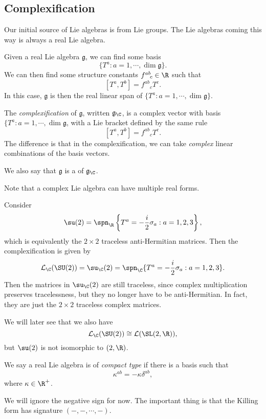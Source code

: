 \documentclass[a4paper]{article}
\begin{document}
\subsection{Complexification}
Our initial source of Lie algebras is from Lie groups. The Lie algebras coming this way is always a real Lie algebra.

\begin{defi}
  Given a real Lie algebra $\mathfrak{g}$, we can find some basis
  \[
    \{T^a: a = 1, \cdots, \dim \mathfrak{g}\}.
  \]
  We can then find some structure constants $f^{ab}\!_c \in \R$ such that
  \[
    [T^a, T^b] = f^{ab}\!_c T^c.
  \]
  In this case, $\mathfrak{g}$ is then the real linear span of $\{T^a: a = 1, \cdots, \dim \mathfrak{g}\}$.

  The \emph{complexification} of $\mathfrak{g}$, written $\mathfrak{g}_\C$, is a complex vector with basis $\{T^a: a = 1, \cdots, \dim \mathfrak{g}$, with a Lie bracket defined by the same rule
  \[
    [T^a, T^b] = f^{ab}\!_c T^c.
  \]
  The difference is that in the complexification, we can take \emph{complex} linear combinations of the basis vectors.

  We also say that $\mathfrak{g}$ is a  of $\mathfrak{g}_\C$.
\end{defi}
Note that a complex Lie algebra can have multiple real forms.

\begin{eg}
  Consider
  \[
    \su(2) = \spn_\R\left\{T^a = -\frac{i}{2} \sigma_a: a = 1, 2, 3\right\},
  \]
  which is equivalently the $2 \times 2$ traceless anti-Hermitian matrices. Then the complexification is given by
  \[
    \mathcal{L}_\C (\SU(2)) = \su_\C(2) = \spn_\C \{T^a = -\frac{i}{2} \sigma_a: a = 1, 2, 3\}.
  \]
  Then the matrices in $\su_\C(2)$ are still traceless, since complex multiplication preserves tracelessness, but they no longer have to be anti-Hermitian. In fact, they are just the $2 \times 2$ traceless complex matrices.
\end{eg}

We will later see that we also have
\[
  \mathcal{L}_\C(\SU(2)) \cong \mathcal{L}(\SL(2, \R)),
\]
but $\su(2)$ is not isomorphic to $\sl(2, \R)$.

\begin{defi}
  We say a real Lie algebra is of \emph{compact type} if there is a basis such that
  \[
    \kappa^{ab} = - \kappa \delta^{ab},
  \]
  where $\kappa \in \R^+$.
\end{defi}
We will ignore the negative sign for now. The important thing is that the Killing form has signature $(-, -, \cdots, -)$.
\end{document}

